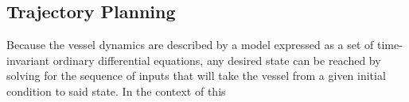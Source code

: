 \subsection{Trajectory Planning} \label{CHAP: Trajectory planning}
Because the vessel dynamics are described by a model expressed as a set of time-invariant ordinary differential equations, any desired state
can be reached by solving for the sequence of inputs that will take the vessel from a given initial condition to said state. In the context of this
